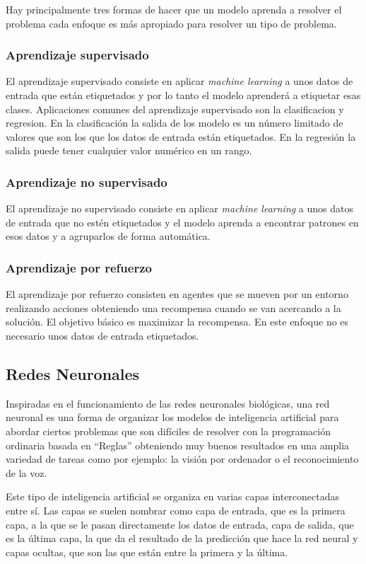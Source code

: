 \documentclass[12pt,a4paper]{article}
\begin{document}
Hay principalmente tres formas de hacer que un modelo aprenda a resolver el problema cada enfoque es más apropiado para resolver un tipo de problema.

\subsubsection{Aprendizaje supervisado}
El aprendizaje supervisado consiste en aplicar \textit{machine learning} a unos datos de entrada que están etiquetados y por lo tanto el modelo aprenderá a etiquetar esas clases. Aplicaciones comunes del aprendizaje supervisado son la clasificacion y regresion. En la clasificación la salida de los modelo es un número limitado de valores que son los que los datos de entrada están etiquetados. En la regresión la salida puede tener cualquier valor numérico en un rango.

\subsubsection{Aprendizaje no supervisado}
El aprendizaje no supervisado consiste en aplicar \textit{machine learning} a unos datos de entrada que no estén etiquetados y el modelo aprenda a encontrar patrones en esos datos y a agruparlos de forma automática.

\subsubsection{Aprendizaje por refuerzo}
El aprendizaje por refuerzo consisten en agentes que se mueven por un entorno realizando acciones obteniendo una recompensa cuando se van acercando a la solución. El objetivo básico es maximizar la recompensa. En este enfoque no es necesario unos datos de entrada etiquetados.

\subsection{Redes Neuronales}
Inspiradas en el funcionamiento de las redes neuronales biológicas, una red neuronal es una forma de organizar los modelos de inteligencia artificial para abordar ciertos problemas que son difíciles de resolver con la programación ordinaria basada en ``Reglas'' obteniendo muy buenos resultados en una amplia variedad de tareas como por ejemplo: la visión por ordenador o el reconocimiento de la voz.
\bigskip

Este tipo de inteligencia artificial se organiza en varias capas interconectadas entre sí. Las capas se suelen nombrar como capa de entrada, que es la primera capa, a la que se le pasan directamente los datos de entrada, capa de salida, que es la última capa, la que da el resultado de la predicción que hace la red neural y capas ocultas, que son las que están entre la primera y la última.
\bigskip
\end{document}
